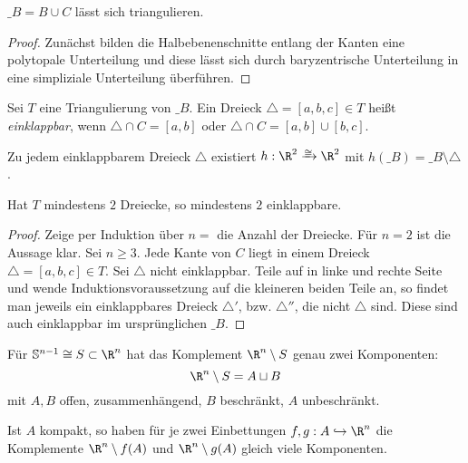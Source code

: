 \begin{lem}
	$\_B = B \cup C$ lässt sich triangulieren.
	\begin{proof}
		Zunächst bilden die Halbebenenschnitte entlang der Kanten eine polytopale Unterteilung und diese lässt sich durch baryzentrische Unterteilung in eine simpliziale Unterteilung überführen.
	\end{proof}
\end{lem}

\begin{df}
	Sei $T$ eine Triangulierung von $\_B$.
	Ein Dreieck $\triangle = [a,b,c] \in T$ heißt \emph{einklappbar}, wenn $\triangle \cap C = [a,b]$ oder $\triangle \cap C = [a,b] \cup [b,c]$.
\end{df}

\begin{lem}
	Zu jedem einklappbarem Dreieck $\triangle$ existiert $h: \R^2 \homeomorphicto \R^2$ mit $h(\_B) = \_{B \setminus \triangle}$.
\end{lem}

\begin{lem}
	Hat $T$ mindestens $2$ Dreiecke, so mindestens $2$ einklappbare.
	\begin{proof}
		Zeige per Induktion über $n = $ die Anzahl der Dreiecke.
		Für $n = 2$ ist die Aussage klar.
		Sei $n \ge 3$.
		Jede Kante von $C$ liegt in einem Dreieck $\triangle = [a,b,c] \in T$.
		Sei $\triangle$ \oBdA nicht einklappbar.
		Teile auf in linke und rechte Seite und wende Induktionsvoraussetzung auf die kleineren beiden Teile an, so findet man jeweils ein einklappbares Dreieck $\triangle'$, bzw. $\triangle''$, die nicht $\triangle$ sind.
		Diese sind auch einklappbar im ursprünglichen $\_B$.
	\end{proof}
\end{lem}


\begin{st}
	Für $\S^{n-1} \homeomorphic S \subset \R^n$ hat das Komplement $\R^n \setminus S$ genau zwei Komponenten:
	\[
		\R^n \setminus S
		= A \dunion B
	\]
	mit $A, B$ offen, zusammenhängend, $B$ beschränkt, $A$ unbeschränkt.
\end{st}

\begin{st}[Alexander]
	Ist $A$ kompakt, so haben für je zwei Einbettungen $f, g: A \injto \R^n$ die Komplemente $\R^n \setminus f(A)$ und $\R^n \setminus g(A)$ gleich viele Komponenten.
\end{st}

